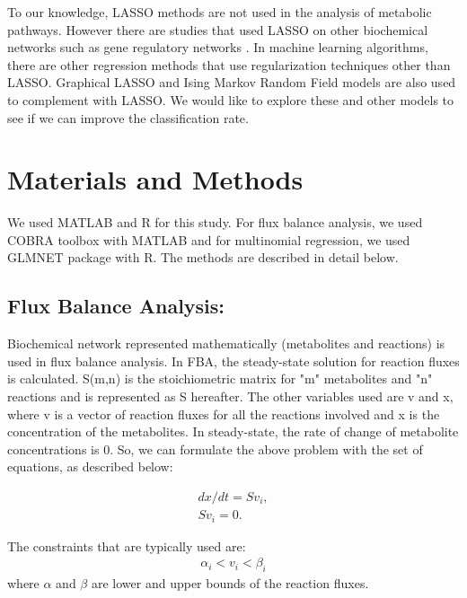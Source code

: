 \documentclass[12pt]{article}
\begin{document}
\bigskip
\noindent
To our knowledge, LASSO methods are not used in the analysis of metabolic pathways. However there are studies that used LASSO on other biochemical networks such as gene regulatory networks \cite{Menendezetal2010}. In machine learning algorithms, there are other regression methods that use regularization techniques other than LASSO. Graphical LASSO \cite{Friedmanetal2008} and Ising Markov Random Field models \cite{Ravikumaretal2010} are also used to complement with LASSO. We would like to explore these and other models to see if we can improve the classification rate.


\section*{Materials and Methods}
We used MATLAB and R for this study. For flux balance analysis, we used COBRA toolbox \cite{Schellenbergeretal2011} with MATLAB and for multinomial regression, we used GLMNET package \cite{Friedmanetal2010} with R. The methods are described in detail below.

\subsection*{Flux Balance Analysis:} 
Biochemical network represented mathematically (metabolites and reactions) is used in flux balance analysis. In FBA, the steady-state solution for reaction fluxes is calculated. S(m,n) is the stoichiometric matrix for "m" metabolites and "n" reactions and is represented as S hereafter. The other variables used are v and x, where v is a vector of reaction fluxes for all the reactions involved and x is the concentration of the metabolites. In steady-state, the rate of change of metabolite concentrations is 0. So, we can formulate the above problem with the set of equations, as described below:

\begin{align}
dx/dt = Sv_{i}, \\
Sv_{i}=0.
\end{align}

The constraints that are typically used are: 
\begin{align}
\alpha_{i}<v_{i}<\beta_{i}
\end{align}
where $\alpha$ and $\beta$ are lower and upper bounds of the reaction fluxes.
\end{document}
